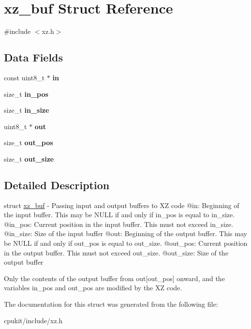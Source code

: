 \hypertarget{structxz__buf}{}\section{xz\+\_\+buf Struct Reference}
\label{structxz__buf}


{\ttfamily \#include $<$xz.\+h$>$}

\subsection*{Data Fields}
\begin{DoxyCompactItemize}
\item 
\mbox{\label{structxz__buf_a58ea98100d1d4593f4b7c6f276006272}} 
const uint8\+\_\+t $\ast$ {\bfseries in}
\item 
\mbox{\label{structxz__buf_a4f4b3b9f56ab8d89c9edca5ffd27ac79}} 
size\+\_\+t {\bfseries in\+\_\+pos}
\item 
\mbox{\label{structxz__buf_ae7665726ded714572c56c90244f71f11}} 
size\+\_\+t {\bfseries in\+\_\+size}
\item 
\mbox{\label{structxz__buf_ad64100f202716e86b8416b7d7a072a24}} 
uint8\+\_\+t $\ast$ {\bfseries out}
\item 
\mbox{\label{structxz__buf_a7c4005a0998bef480271332efe506f8f}} 
size\+\_\+t {\bfseries out\+\_\+pos}
\item 
\mbox{\label{structxz__buf_a7d55c01a4ec95fa6ed0ba10945a9d07d}} 
size\+\_\+t {\bfseries out\+\_\+size}
\end{DoxyCompactItemize}


\subsection{Detailed Description}
struct \mbox{\hyperlink{structxz__buf}{xz\+\_\+buf}} -\/ Passing input and output buffers to XZ code @in\+: Beginning of the input buffer. This may be N\+U\+LL if and only if in\+\_\+pos is equal to in\+\_\+size. @in\+\_\+pos\+: Current position in the input buffer. This must not exceed in\+\_\+size. @in\+\_\+size\+: Size of the input buffer @out\+: Beginning of the output buffer. This may be N\+U\+LL if and only if out\+\_\+pos is equal to out\+\_\+size. @out\+\_\+pos\+: Current position in the output buffer. This must not exceed out\+\_\+size. @out\+\_\+size\+: Size of the output buffer

Only the contents of the output buffer from out\mbox{[}out\+\_\+pos\mbox{]} onward, and the variables in\+\_\+pos and out\+\_\+pos are modified by the XZ code. 

The documentation for this struct was generated from the following file\+:\begin{DoxyCompactItemize}
\item 
cpukit/include/xz.\+h\end{DoxyCompactItemize}
